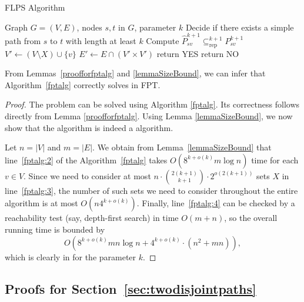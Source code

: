 \documentclass[a4paper,english]{lipics-v2016}
\theoremstyle{plain}
\begin{document}
\begin{algorithm}[t]
\caption{FLPS Algorithm} \begin{algorithmic}[1]
\Require Graph $G=(V,E)$, nodes $s,t$ in $G$, parameter $k$ 
\Ensure Decide if there exists a simple path from $s$ to $t$ with length at least $k$
\State Compute $\hat{P}^{k+1}_{sv} \subseteq^{k+1}_\text{rep} P^{k+1}_{sv}$\label{fptalg:2}
\label{fptalg:3}
\State $V' \gets (V\setminus X)\cup \{v\}$
\State $E' \gets E \cap (V' \times V')$
\label{fptalg:4} 
\State return YES
\EndIf
\EndFor
\EndFor
\State return NO
\end{algorithmic}
\label{fptalg}
\end{algorithm}

From Lemmas~\ref{proofforfptalg} and \ref{lemmaSizeBound}, we can
infer that Algorithm~\ref{fptalg} correctly solves
\longdirpath in FPT.

\LongDirPathFPT*
\begin{proof}
  The problem can be solved using Algorithm \ref{fptalg}. Its
  correctness follows directly from Lemma \ref{proofforfptalg}. Using
  Lemma \ref{lemmaSizeBound}, we 
  now show that the algorithm is indeed a \fpt algorithm.

   

  Let $n = |V|$ and $m = |E|$.  We obtain from
  Lemma~\ref{lemmaSizeBound} that line~\ref{fptalg:2} of the
  Algorithm~\ref{fptalg} takes $O\left( 8^{k+o(k)}m \log n \right)$
  time for each $v \in V$. Since we need to consider at most $n \cdot
  \binom{2(k+1)}{{k+1}} \cdot 2^{o(2(k+1))} $ sets $X$ in
  line~\ref{fptalg:3}, the number of such sets we need to consider
  throughout the entire algorithm is at most
  $O(n4^{k+o(k)})$. Finally, line~\ref{fptalg:4} can be checked by
  a reachability test (say, depth-first search) in time $O(m+n)$, so the overall running time is bounded
  by $$O\left( 8^{k+o(k)}mn \log n + 4^{k+o(k)}\cdot(n^2+mn)
  \right),$$ which is clearly in \fpt for the parameter $k$.
\end{proof}




\subsection*{Proofs for Section~\ref{sec:twodisjointpaths}}\label{app:twodisjointpaths}
\end{document}

